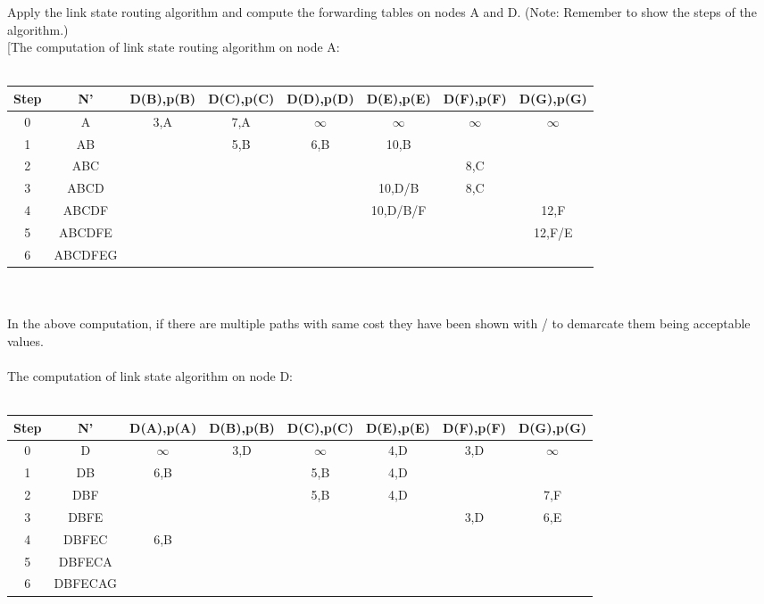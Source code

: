 \begin{question}
Apply the link state routing algorithm and compute the forwarding tables on nodes A and D. (Note: Remember to show the steps of the algorithm.)\\
\answerfigure[The computation of link state routing algorithm
on node A:\\ \\
\begin{tabular}{|c|c|c|c|c|c|c|c|}
\hline
  Step & N' & D(B),p(B) & D(C),p(C) & D(D),p(D) & D(E),p(E) & D(F),p(F) & D(G),p(G) \\ \hline
  0 & A & 3,A & 7,A & $\infty$ & $\infty$ & $\infty$ & $\infty$ \\ \hline
  1 & AB &  & 5,B & 6,B & 10,B &  &  \\ \hline
  2 & ABC &  &  &  &  & 8,C &  \\ \hline
  3 & ABCD &  &  &  & 10,D/B & 8,C & \\ \hline
  4 & ABCDF &  &  &  & 10,D/B/F &  & 12,F \\ \hline
  5 & ABCDFE & & & & & & 12,F/E \\ \hline
  6 & ABCDFEG & & & & & & \\ \hline
\end{tabular}\\ \\
In the above computation, if there are multiple paths with same
cost they have been shown with / to demarcate them being
acceptable values. \\ \\
The computation of link state algorithm on node D:\\ \\
\begin{tabular}{|c|c|c|c|c|c|c|c|}
\hline
  Step & N' & D(A),p(A) & D(B),p(B) & D(C),p(C) & D(E),p(E) & D(F),p(F) & D(G),p(G) \\ \hline
  0 & D & $\infty$ & 3,D & $\infty$ & 4,D & 3,D & $\infty$ \\ \hline
  1 & DB & 6,B &  & 5,B & 4,D &  &  \\ \hline
  2 & DBF &  &  & 5,B & 4,D & & 7,F \\ \hline
  3 & DBFE &  &  &  &  & 3,D & 6,E \\ \hline
  4 & DBFEC & 6,B &  &  &  &  &  \\ \hline
  5 & DBFECA & & & & & & \\ \hline
  6 & DBFECAG & & & & & & \\ \hline
\end{tabular}\\ \\

\end{question}
